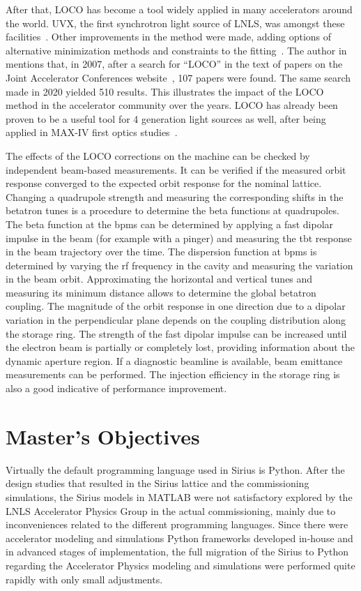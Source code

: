 After that, LOCO has become a tool widely applied in many accelerators around the world. UVX, the first synchrotron light source of LNLS, was amongst these facilities~\cite{resende2010}. Other improvements in the method were made, adding options of alternative minimization methods and constraints to the fitting~\cite{icfa_huang}. The author in~\cite{icfa_safranek} mentions that, in 2007, after a search for ``LOCO'' in the text of papers on the Joint Accelerator Conferences website~\cite{jacow}, 107 papers were found. The same search made in 2020 yielded 510 results. This illustrates the impact of the LOCO method in the accelerator community over the years. LOCO has already been proven to be a useful tool for 4 generation light sources as well, after being applied in MAX-IV first optics studies~\cite{leemann2017}.

The effects of the LOCO corrections on the machine can be checked by independent beam-based measurements. It can be verified if the measured orbit response converged to the expected orbit response for the nominal lattice. Changing a quadrupole strength and measuring the corresponding shifts in the betatron tunes is a procedure to determine the beta functions at quadrupoles. The beta function at the \glspl{bpm} can be determined by applying a fast dipolar impulse in the beam (for example with a pinger) and measuring the \gls{tbt} response in the beam trajectory over the time. The dispersion function at \glspl{bpm} is determined by varying the \gls{rf} frequency in the cavity and measuring the variation in the beam orbit. Approximating the horizontal and vertical tunes and measuring its minimum distance allows to determine the global betatron coupling. The magnitude of the orbit response in one direction due to a dipolar variation in the perpendicular plane depends on the coupling distribution along the storage ring. The strength of the fast dipolar impulse can be increased until the electron beam is partially or completely lost, providing information about the dynamic aperture region. If a diagnostic beamline is available, beam emittance measurements can be performed. The injection efficiency in the storage ring is also a good indicative of performance improvement.
\section{Master's Objectives}\label{sec:master_obj}
Virtually the default programming language used in Sirius is Python. After the design studies that resulted in the Sirius lattice and the commissioning simulations, the Sirius models in MATLAB were not satisfactory explored by the LNLS Accelerator Physics Group in the actual commissioning, mainly due to inconveniences related to the different programming languages. Since there were accelerator modeling and simulations Python frameworks developed in-house and in advanced stages of implementation, the full migration of the Sirius to Python regarding the Accelerator Physics modeling and simulations were performed quite rapidly with only small adjustments.
 
